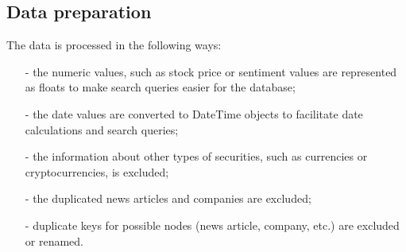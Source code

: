 \subsection{Data preparation}
\label{cha:data-preparation}
The data is processed in the following ways:

\begin{itemize}
\item[-] the numeric values, such as stock price or sentiment values are represented as floats to make search queries easier for the database;
\item[-] the date values are converted to DateTime objects to facilitate date calculations and search queries;
\item[-] the information about other types of securities, such as currencies or cryptocurrencies, is excluded;
\item[-]the duplicated news articles and companies are excluded;
\item[-] duplicate keys for possible nodes (news article, company, etc.) are excluded or renamed.
\end{itemize}








